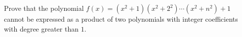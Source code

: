 Prove that the polynomial $f(x)=(x^2+1)(x^2+2^2)\cdots (x^2+n^2)+1$ cannot be expressed as a product of two polynomials with integer coefficients with degree greater than $1$.